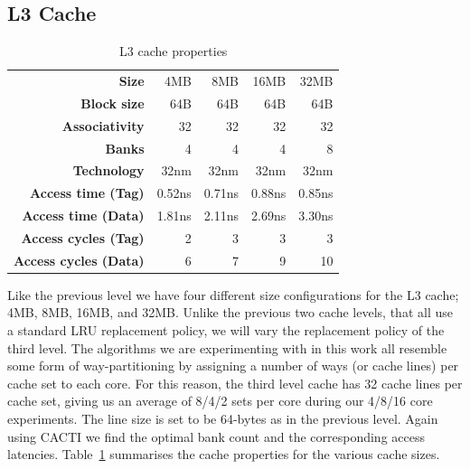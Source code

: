 \subsection{L3 Cache}
\begin{table}[ht]
\centering
\begin{tabular}{rrrrr}
\toprule
\bf{Size}                 & 4MB         & 8MB         & 16MB        & 32MB              \\
\bf{Block size}           & 64B         & 64B         & 64B         & 64B               \\
\bf{Associativity}        & 32          & 32          & 32          & 32                \\
\bf{Banks}                & 4           & 4           & 4           & 8                 \\
\bf{Technology}           & 32nm        & 32nm        & 32nm        & 32nm              \\
\bf{Access time (Tag)}    & 0.52ns      & 0.71ns      & 0.88ns      & 0.85ns            \\
\bf{Access time (Data)}   & 1.81ns      & 2.11ns      & 2.69ns      & 3.30ns            \\
\bf{Access cycles (Tag)}  & 2           & 3           & 3           & 3                 \\
\bf{Access cycles (Data)} & 6           & 7           & 9           & 10                \\
\bottomrule
\end{tabular}
\caption{L3 cache properties}
\label{tbl:processor_model:l3}
\end{table}

Like the previous level we have four different size configurations for the L3 cache; 4MB, 8MB, 16MB, and 32MB.
Unlike the previous two cache levels, that all use a standard LRU replacement policy, we will vary the replacement policy of the third level.
The algorithms we are experimenting with in this work all resemble some form of way-partitioning by assigning a number of ways (or cache lines) per cache set to each core.
For this reason, the third level cache has 32 cache lines per cache set, giving us an average of 8/4/2 sets per core during our 4/8/16 core experiments.
The line size is set to be 64-bytes as in the previous level.
Again using CACTI we find the optimal bank count and the corresponding access latencies.
Table~\ref{tbl:processor_model:l3} summarises the cache properties for the various cache sizes.